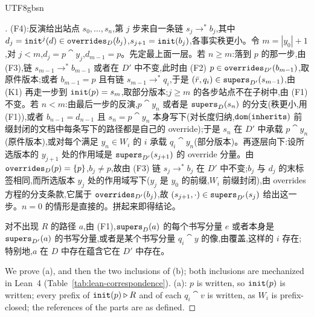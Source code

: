 \begin{CJK*}{UTF8}{gbsn}
\begin{proof}[]
\begin{sloppypar}
(F4):反演给出站点 $s_0, \ldots, s_n$,第 $j$ 步来自一条链 $s_j \to^* b_j$,其中 $d_j = \mathtt{init}^j(d) \in \mathtt{overrides}_D(b_j)$,$s_{j+1} = \mathtt{init}(b_j)$,各事实秩更小。令 $m = |y_0| + 1$,对 $j < m$,$d_j = p \cat y_j$,$d_{m-1} = p$。先定最上面一层。若 $n \ge m$:落到 $p$ 的那一步,由 (F3),链 $s_{m-1} \to^* b_{m-1}$ 或者在 $D'$ 中不变,此时由 (F2) $p \in \mathtt{overrides}_{D'}(b_{m-1})$,取原件版本;或者 $b_{m-1} = p$ 且有链 $s_{m-1} \to^* q_i$,于是 $(\bar r, q_i) \in \mathtt{supers}_{D'}(s_{m-1})$,由 (K1) 再走一步到 $\mathtt{init}(p) = s_m$,取部分版本;$j \ge m$ 的各步站点不在子树中,由 (F1) 不变。若 $n < m$:由最后一步的反演,$p \cat y_n$ 或者是 $\mathtt{supers}_D(s_n)$ 的分支(秩更小,用 (F1)),或者 $b_{n-1} = d_{n-1}$ 且 $s_n = p \cat y_n$ 本身写下(对长度归纳,$\mathtt{dom}(\mathtt{inherits})$ 前缀封闭的文档中每条写下的路径都是自己的 override);于是 $s_n$ 在 $D'$ 中承载 $p \cat y_n$(原件版本),或对每个满足 $y_n \in W_i$ 的 $i$ 承载 $q_i \cat y_n$(部分版本)。再逐层向下:设所选版本的 $y_{j+1}$ 处的作用域是 $\mathtt{supers}_{D'}(s_{j+1})$ 的 override 分量。由 $\mathtt{overrides}_D(p) = \{p\}$,$b_j \ne p$,故由 (F3) 链 $s_j \to^* b_j$ 在 $D'$ 中不变;$b_j$ 与 $d_j$ 的末标签相同,而所选版本 $y_j$ 处的作用域写下($y_j$ 是 $y_0$ 的前缀,$W_i$ 前缀封闭),由 overrides 方程的分支条款,它属于 $\mathtt{overrides}_{D'}(b_j)$,故 $(s_{j+1}, \cdot) \in \mathtt{supers}_{D'}(s_j)$ 给出这一步。$n = 0$ 的情形是直接的。拼起来即得结论。

对不出现 $R$ 的路径 $a$,由 (F1),$\mathtt{supers}_D(a)$ 的每个书写分量 $e$ 或者本身是 $\mathtt{supers}_{D'}(a)$ 的书写分量,或者是某个书写分量 $q_i \cat y$ 的像,由覆盖,这样的 $i$ 存在;特别地,$a$ 在 $D$ 中存在蕴含它在 $D'$ 中存在。
\end{sloppypar}
\else
\begin{sloppypar}
We prove (a), and then the two inclusions of (b); both inclusions are mechanized in Lean~4
(Table~\ref{tab:lean-correspondence}). (a): $p$ is written, so $\mathtt{init}(p)$ is
written; every prefix of $\mathtt{init}(p) \mathbin{\triangleright} R$ and of each $q_i \cat v$ is written, as $W_i$ is
prefix-closed; the references of the parts are as defined.


\end{sloppypar}
\end{proof}
\end{CJK*}

